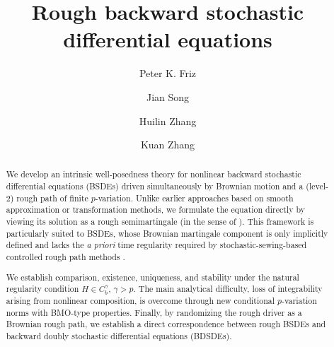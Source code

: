 \documentclass[11pt,reqno]{amsart}
\numberwithin{equation}{section}
\begin{document}
\title[Rough BSDEs]{Rough backward stochastic differential equations}

\author{Peter K. Friz}
\address{Institut für Mathematik, 
Technische Universität Berlin and Weierstraß Institut, Berlin, Germany}


\author[J. Song]{Jian Song}\address{Research Center for Mathematics and Interdisciplinary Sciences; Frontiers Science Center for Nonlinear Expectations, Ministry of Education, Shandong University, Qingdao 266237, China}

\author[H. Zhang]{Huilin Zhang}\address{Research Center for Mathematics and Interdisciplinary Sciences; Frontiers Science Center for Nonlinear Expectations (Ministry of Education), Shandong University, Qingdao 266237, China}

\author[K. Zhang]{Kuan Zhang}\address{Institute for Theoretical Sciences, Westlake Institute for Advanced Study, Westlake University, Hangzhou, Zhejiang, 310030, China}



\begin{abstract}

We develop an intrinsic well-posedness theory for nonlinear backward stochastic differential equations (BSDEs) driven simultaneously by Brownian motion and a (level-$2$) rough path of finite $p$-variation. 
Unlike earlier approaches based on smooth approximation or transformation methods, we formulate the equation directly by viewing its solution as a rough semimartingale (in the sense of \cite{friz2023rough}). 
This framework is particularly suited to BSDEs, whose Brownian martingale component is only implicitly defined and lacks the \emph{a priori} time regularity required by stochastic-sewing-based controlled rough path methods \cite{fhl21,allan2024rough}. 

We establish comparison, existence, uniqueness, and stability under the natural regularity condition $H\in C_b^\gamma$, $\gamma>p$. The main analytical difficulty, loss of integrability arising from nonlinear composition, is overcome through new conditional $p$-variation norms with BMO-type properties. Finally, by randomizing the rough driver as a Brownian rough path, we establish a direct correspondence between rough BSDEs and backward doubly stochastic differential equations (BDSDEs). 
\end{abstract}
\end{document}
